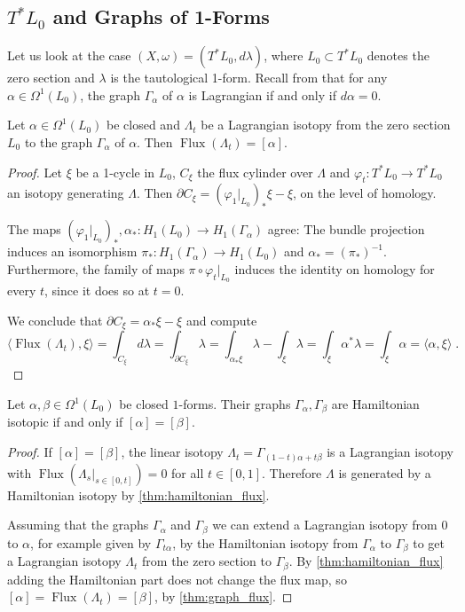 \documentclass[12pt,a4paper,abstract=true,draft]{scrartcl}
\DeclareMathOperator{\Flux}{Flux}
\begin{document}
\subsection{\texorpdfstring{$T^* L_0$}{T*L} and Graphs of 1-Forms} 
\label{sec:vdcotangent}

Let us look at the case $(X,ω)=(T^* L_0,d λ)$, where $L_0 ⊂ T^* L_0$ denotes the zero section and $λ$ is the tautological 1-form.
Recall from \cite{McDuffSalamonSympTop} that for any $α ∈ Ω^1(L_0)$, the graph $Γ_α$ of $α$ is Lagrangian if and only if $d α=0$.

\begin{lemma}
  \label{thm:graph_flux}
  Let $α ∈ Ω^1(L_0)$ be closed and $Λ_t$ be a Lagrangian isotopy from the zero section $L_0$ to the graph $Γ_α$ of $α$.
Then $\Flux(Λ_t) = [α]$.
\end{lemma}
\begin{proof}
  Let $ξ$ be a 1-cycle in $L_0$, $C_ξ$ the flux cylinder over $Λ$ and $\varphi_t \colon T^*L_0 \rightarrow T^*L_0$ an isotopy generating $\Lambda$.
Then $∂C_ξ = (\varphi_1\vert_{L_0})_* ξ - ξ$, on the level of homology.

The maps $(\varphi_1\vert_{L_0})_*, \alpha_* \colon H_1(L_0) \rightarrow H_1(\Gamma_{\alpha})$ agree:
The bundle projection induces an isomorphism $\pi_* \colon H_1(Γ_α) \rightarrow H_1(L_0)$ and $\alpha_* = (\pi_*)^{-1}$. Furthermore, the family of maps $\pi \circ \varphi_t\vert_{L_0}$ induces the identity on homology for every $t$, since it does so at $t=0$.

We conclude that $∂C_ξ = α_* ξ - ξ$ and compute
  \[⟨\Flux(Λ_t),ξ ⟩ = ∫_{C_ξ} dλ = ∫_{∂C_ξ} λ = ∫_{α_* ξ}λ - ∫_{ξ} λ = ∫_{ξ} α^* λ = ∫_{ξ} α = ⟨α,ξ⟩ \;.\]
\end{proof}

\begin{lemma}
  \label{thm:graph_hamiltonian_isotopic}
  Let $\alpha,\beta \in  \Omega^1(L_0)$ be closed $1$-forms.
Their graphs $\Gamma_{\alpha}, \Gamma_{\beta}$ are Hamiltonian isotopic if and only if $[\alpha] = [\beta]$.
\end{lemma}
\begin{proof}
If $[\alpha] = [\beta]$, the linear isotopy $\Lambda_t = Γ_{(1-t)α + t β}$ is a Lagrangian isotopy with $\Flux(Λ_s|_{s ∈ [0,t]}) = 0$ for all $t \in [0,1]$.
Therefore $\Lambda$ is generated by a Hamiltonian isotopy by \cref{thm:hamiltonian_flux}.

  Assuming that the graphs $Γ_α$ and $Γ_β$ we can extend a Lagrangian isotopy from $0$ to $α$, for example given by $Γ_{tα}$, by the Hamiltonian isotopy from $Γ_α$ to $Γ_β$ to get a Lagrangian isotopy $Λ_t$ from the zero section to $Γ_β$.
By \cref{thm:hamiltonian_flux} adding the Hamiltonian part does not change the flux map, so $[α] = \Flux(Λ_t) = [β]$, by \cref{thm:graph_flux}.
\end{proof}
\end{document}
